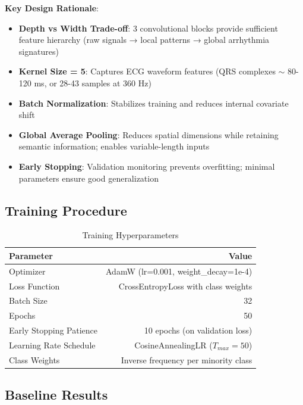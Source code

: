 \documentclass[12pt, a4paper]{article}
\begin{document}
\textbf{Key Design Rationale}:
\begin{itemize}
    \item \textbf{Depth vs Width Trade-off}: 3 convolutional blocks provide sufficient feature hierarchy (raw signals → local patterns → global arrhythmia signatures)
    \item \textbf{Kernel Size = 5}: Captures ECG waveform features (QRS complexes $\sim$ 80-120 ms, or 28-43 samples at 360 Hz)
    \item \textbf{Batch Normalization}: Stabilizes training and reduces internal covariate shift
    \item \textbf{Global Average Pooling}: Reduces spatial dimensions while retaining semantic information; enables variable-length inputs
    \item \textbf{Early Stopping}: Validation monitoring prevents overfitting; minimal parameters ensure good generalization
\end{itemize}

\subsection{Training Procedure}

\begin{table}[H]
\centering
\caption{Training Hyperparameters}
\begin{tabular}{lr}
\toprule
\textbf{Parameter} & \textbf{Value} \\
\midrule
Optimizer & AdamW (lr=0.001, weight\_decay=1e-4) \\
Loss Function & CrossEntropyLoss with class weights \\
Batch Size & 32 \\
Epochs & 50 \\
Early Stopping Patience & 10 epochs (on validation loss) \\
Learning Rate Schedule & CosineAnnealingLR ($T_{max}=50$) \\
Class Weights & Inverse frequency per minority class \\
\bottomrule
\end{tabular}
\label{tab:training_hyperparams}
\end{table}

\subsection{Baseline Results}
\end{document}
